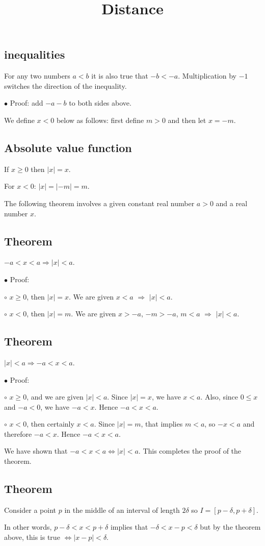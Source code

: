 \documentclass[11pt, oneside]{article}
\title{Distance}
\date{}
\begin{document}
\maketitle
\Large
\subsection*{inequalities}
For any two numbers $a < b$ it is also true that $-b < -a$.  Multiplication by $-1$ switches the direction of the inequality.

$\bullet$  Proof:  add $-a -b$ to both sides above.

We define $x < 0$ below as follows:  first define $m > 0$ and then let $x = -m$.
\subsection*{Absolute value function}
If $x \ge 0$ then $|x| = x$.

For $x < 0$:   $|x| = |-m| = m$.

The following theorem involves a given constant real number $a > 0$ and a real number $x$.
\subsection*{Theorem}
$-a < x < a \Rightarrow |x| < a$.

$\bullet$  Proof:

$\circ$  $x \ge 0$, then $|x| = x$.  We are given $x < a$ $\Rightarrow$ $|x| < a$.

$\circ$  $ x < 0$, then $|x| = m$.  We are given $x > -a$, $-m > -a$, $m < a$ $\Rightarrow$ $|x| < a$.
\subsection*{Theorem}
$|x| < a  \Rightarrow -a < x < a$.

$\bullet$  Proof:

$\circ$  $x \ge 0$, and we are given $|x| < a$.  Since $|x| = x$, we have $x < a$.  Also, since $0 \le x$ and $-a < 0$, we have $-a < x$.  Hence $-a < x < a$.

$\circ$  $x < 0$, then certainly $x < a$.  Since $|x| = m$, that implies $m < a$, so $-x < a$ and therefore $-a < x$.  Hence $-a < x < a$.

We have shown that $-a < x < a \iff |x| < a$.  This completes the proof of the theorem.

\subsection*{Theorem}
Consider a point $p$ in the middle of an interval of length $2 \delta$ so $I = [p - \delta, p + \delta]$.

In other words, $p - \delta < x < p + \delta$ implies that $- \delta < x - p < \delta$ but by the theorem above, this is true $\iff |x-p| < \delta$.
\end{document}
